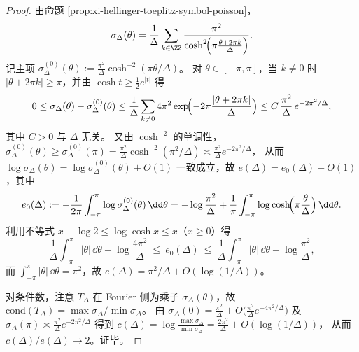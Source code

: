 \begin{proof}
由命题 \ref{prop:xi-hellinger-toeplitz-symbol-poisson}，
\[
\sigma_\Delta(\theta)=\frac{1}{\Delta}\sum_{k\in\ZZ}\frac{\pi^{2}}{\cosh^{2}\!\Bigl(\pi\frac{\theta+2\pi k}{\Delta}\Bigr)}.
\]
记主项
\(
\sigma_\Delta^{(0)}(\theta):=\frac{\pi^{2}}{\Delta}\cosh^{-2}(\pi\theta/\Delta)
\)。
对 \(\theta\in[-\pi,\pi]\)，当 \(k\neq0\) 时 \(|\theta+2\pi k|\ge\pi\)，并由 \(\cosh t\ge \tfrac12 e^{|t|}\) 得
\[
0\le \sigma_\Delta(\theta)-\sigma_\Delta^{(0)}(\theta)
\le \frac{1}{\Delta}\sum_{k\neq0}4\pi^{2}\exp\!\Bigl(-2\pi\frac{|\theta+2\pi k|}{\Delta}\Bigr)
\le C\,\frac{\pi^{2}}{\Delta}\,e^{-2\pi^{2}/\Delta},
\]
其中 \(C>0\) 与 \(\Delta\) 无关。
又由 \(\cosh^{-2}\) 的单调性，
\(
\sigma_\Delta^{(0)}(\theta)\ge \sigma_\Delta^{(0)}(\pi)=\frac{\pi^{2}}{\Delta}\cosh^{-2}(\pi^{2}/\Delta)
\asymp \frac{\pi^{2}}{\Delta}e^{-2\pi^{2}/\Delta}
\)，
从而 \(\log\sigma_\Delta(\theta)=\log\sigma_\Delta^{(0)}(\theta)+O(1)\) 一致成立，故 \(e(\Delta)=e_0(\Delta)+O(1)\)，其中
\[
e_0(\Delta):=-\frac{1}{2\pi}\int_{-\pi}^{\pi}\log\sigma_\Delta^{(0)}(\theta)\,\dd\theta
=-\log\frac{\pi^{2}}{\Delta}+\frac{1}{\pi}\int_{-\pi}^{\pi}\log\cosh\!\Bigl(\pi\frac{\theta}{\Delta}\Bigr)\,\dd\theta.
\]
利用不等式 \(x-\log2\le \log\cosh x\le x\)（\(x\ge0\)）得
\[
\frac{1}{\Delta}\int_{-\pi}^{\pi}|\theta|\,\dd\theta-\log\frac{4\pi^{2}}{\Delta}
\ \le\ e_0(\Delta)\ \le\
\frac{1}{\Delta}\int_{-\pi}^{\pi}|\theta|\,\dd\theta-\log\frac{\pi^{2}}{\Delta},
\]
而 \(\int_{-\pi}^{\pi}|\theta|\,\dd\theta=\pi^{2}\)，故 \(e(\Delta)=\pi^{2}/\Delta+O(\log(1/\Delta))\)。
\par
对条件数，注意 \(T_\Delta\) 在 Fourier 侧为乘子 \(\sigma_\Delta(\theta)\)，故 \(\mathrm{cond}(T_\Delta)=\max\sigma_\Delta/\min\sigma_\Delta\)。
由 \(\sigma_\Delta(0)=\frac{\pi^{2}}{\Delta}+O\!\bigl(\frac{\pi^{2}}{\Delta}e^{-4\pi^{2}/\Delta}\bigr)\) 及
\(
\sigma_\Delta(\pi)\asymp \frac{\pi^{2}}{\Delta}e^{-2\pi^{2}/\Delta}
\)
得到
\(
c(\Delta)=\log\frac{\max\sigma_\Delta}{\min\sigma_\Delta}
=\frac{2\pi^{2}}{\Delta}+O(\log(1/\Delta))
\)，
从而 \(c(\Delta)/e(\Delta)\to2\)。证毕。
\end{proof}

